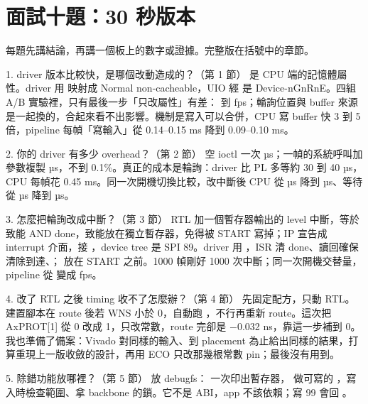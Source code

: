\clearpage
\section{面試十題：30 秒版本}

每題先講結論，再講一個板上的數字或證據。完整版在括號中的章節。

\begin{qashort}{1. driver 版本比較快，是哪個改動造成的？（第 1 節）}
是 CPU 端的記憶體屬性。driver 用  映射成 Normal non-cacheable，UIO 經  是 Device-nGnRnE。四組 A/B 實驗裡，只有最後一步「只改屬性」有差：\abDrvDev{} 到 \abDrvNc{} fps；輪詢位置與 buffer 來源是一起換的，合起來看不出影響。機制是寫入可以合併，CPU 寫 buffer 快 3 到 5 倍，pipeline 每幀「寫輸入」從 0.14--0.15 ms 降到 0.09--0.10 ms。
\end{qashort}

\begin{qashort}{2. 你的 driver 有多少 overhead？（第 2 節）}
空 ioctl 一次 \ioctlUs{} µs；一幀的系統呼叫加參數複製 \bbSysUs{} µs，不到 0.1\%。真正的成本是輪詢：driver 比 PL 多等約 30 到 40 µs，CPU 每幀花 0.45 ms。同一次開機切換比較，改中斷後 CPU 從 \pollCpuUs{} µs 降到 \irqCpuUs{} µs、等待從 \pollWaitUs{} µs 降到 \irqWaitUs{} µs。
\end{qashort}

\begin{qashort}{3. 怎麼把輪詢改成中斷？（第 3 節）}
RTL 加一個暫存器輸出的 level 中斷，等於致能 AND done，致能放在獨立暫存器，免得被 START 寫掉；IP 宣告成 interrupt 介面，接 ，device tree 是 SPI 89。driver 用 ，ISR 清 done、讀回確保清除到達、； 放在 START 之前。1000 幀剛好 1000 次中斷；同一次開機交替量，pipeline 從 \hPollFps{} 變成 \hIrqFps{} fps。
\end{qashort}

\begin{qashort}{4. 改了 RTL 之後 timing 收不了怎麼辦？（第 4 節）}
先固定配方，只動 RTL。建置腳本在 route 後若 WNS 小於 0，自動跑 ，不行再重新 route。這次把 AxPROT[1] 從 0 改成 1，只改常數，route 完卻是 $-$0.032 ns，靠這一步補到 0。我也準備了備案：Vivado 對同樣的輸入、到 placement 為止給出同樣的結果，打算重現上一版收斂的設計，再用 ECO 只改那幾根常數 pin；最後沒有用到。
\end{qashort}

\begin{qashort}{5. 除錯功能放哪裡？（第 5 節）}
放 debugfs： 一次印出暫存器， 做可寫的 ，寫入時檢查範圍、拿 backbone 的鎖。它不是 ABI，app 不該依賴；寫 99 會回 。
\end{qashort}

